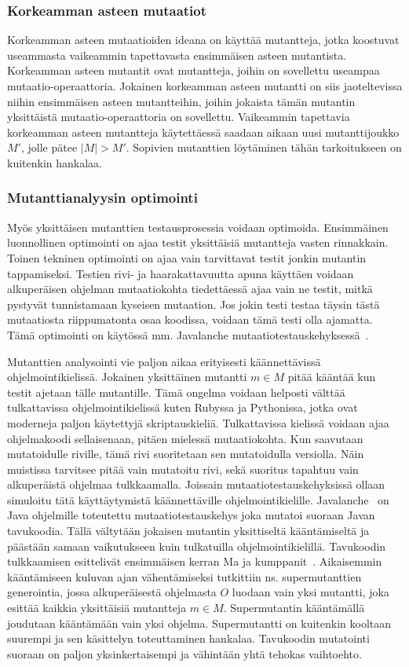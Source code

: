\documentclass{tktltiki}
\begin{document}
\subsubsection{Korkeamman asteen mutaatiot}
Korkeamman asteen mutaatioiden ideana on käyttää mutantteja, jotka koostuvat useammasta vaikeammin tapettavasta ensimmäisen asteen mutantista. Korkeamman asteen mutantit ovat mutantteja, joihin on sovellettu useampaa mutaatio-operaattoria. Jokainen korkeamman asteen mutantti on siis jaoteltevissa niihin ensimmäisen asteen mutantteihin, joihin jokaista tämän mutantin yksittäistä mutaatio-operaattoria on sovellettu. Vaikeammin tapettavia korkeamman asteen mutantteja käytettäessä saadaan aikaan uusi mutanttijoukko $M'$, jolle pätee $|M| > M'$. Sopivien mutanttien löytäminen tähän tarkoitukseen on kuitenkin hankalaa. 

\subsubsection{Mutanttianalyysin optimointi}
Myös yksittäisen mutanttien testausprosessia voidaan optimoida. Ensimmäinen luonnollinen optimointi on ajaa testit yksittäisiä mutantteja vasten rinnakkain. Toinen tekninen optimointi on ajaa vain tarvittavat testit jonkin mutantin tappamiseksi. Testien rivi- ja haarakattavuutta apuna käyttäen voidaan alkuperäisen ohjelman mutaatiokohta tiedettäessä ajaa vain ne testit, mitkä pystyvät tunnistamaan kyseisen mutaation. Jos jokin testi testaa täysin tästä mutaatiosta riippumatonta osaa koodissa, voidaan tämä testi olla ajamatta. Tämä optimointi on käytössä mm. Javalanche mutaatiotestauskehyksessä~\cite{}.

Mutanttien analysointi vie paljon aikaa erityisesti käännettävissä ohjelmointikielissä. Jokainen yksittäinen mutantti $m\in M$ pitää kääntää kun testit ajetaan tälle mutantille. Tämä ongelma voidaan helposti välttää tulkattavissa ohjelmointikielissä kuten Rubyssa ja Pythonissa, jotka ovat moderneja paljon käytettyjä skriptauskieliä. Tulkattavissa kielissä voidaan ajaa ohjelmakoodi sellaisenaan, pitäen mielessä mutaatiokohta. Kun saavutaan mutatoidulle riville, tämä rivi suoritetaan sen mutatoidulla versiolla. Näin muistissa tarvitsee pitää vain mutatoitu rivi, sekä suoritus tapahtuu vain alkuperäistä ohjelmaa tulkkaamalla. Joissain mutaatiotestauskehyksissä ollaan simuloitu tätä käyttäytymistä käännettäville ohjelmointikielille. Javalanche~\cite{} on Java ohjelmille toteutettu mutaatiotestauskehys joka mutatoi suoraan Javan tavukoodia. Tällä vältytään jokaisen mutantin yksittiseltä kääntämiseltä ja päästään samaan vaikutukseen kuin tulkatuilla ohjelmointikielillä. Tavukoodin tulkkaamisen esittelivät ensimmäisen kerran Ma ja kumppanit~\cite{}. Aikaisemmin kääntämiseen kuluvan ajan vähentämiseksi tutkittiin ns. supermutanttien generointia, jossa alkuperäisestä ohjelmasta $O$ luodaan vain yksi mutantti, joka esittää kaikkia yksittäisiä mutantteja $m\in M$. Supermutantin kääntämällä joudutaan kääntämään vain yksi ohjelma. Supermutantti on kuitenkin kooltaan suurempi ja sen käsittelyn toteuttaminen hankalaa. Tavukoodin mutatointi suoraan on paljon yksinkertaisempi ja vähintään yhtä tehokas vaihtoehto.
\end{document}
